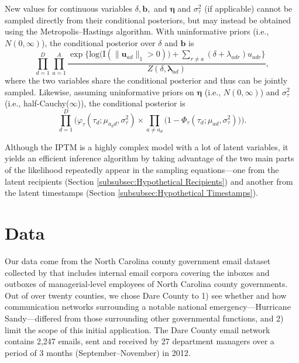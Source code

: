 \documentclass{article}
\begin{document}
New values for continuous variables $\delta, \boldsymbol{b},$ and $\boldsymbol{\eta}$ and $\sigma^2_\tau$ (if applicable) cannot be sampled directly from their conditional posteriors, but may instead be obtained using the Metropolis--Hastings algorithm. With uninformative priors (i.e., $N({0},\infty)$), the conditional posterior over $\delta$ and $\boldsymbol{b}$ is
\begin{equation}
 	   \prod_{d=1}^D
 	   \prod_{a=1}^A \frac{\exp\Big\{\mbox{log}\big(\text{I}( \lVert \boldsymbol{u}_{ad}\rVert_1 > 0)\big) + \sum\limits_{r \neq a} (\delta+\lambda_{adr})u_{adr}\Big\}}{Z(\delta,\boldsymbol{\lambda}_{ad})},
 	   \end{equation}
 	   where the two variables share the conditional posterior and thus can be jointly sampled. Likewise, assuming uninformative priors on $\boldsymbol{\eta}$ (i.e., $N({0},\infty)$) and $\sigma_{\tau}^2$ (i.e., half-Cauchy($\infty$)), the conditional posterior is
 	   \begin{equation}
 	   \prod_{d=1}^D\Big(\varphi_{\tau}(\tau_{d}; \mu_{a_d d}, \sigma_\tau^2)\times \prod_{a\neq a_d}\big(1-\Phi_{\tau}(\tau_{d}; \mu_{a d}, \sigma_\tau^2) \big)\Big).
 	   \end{equation}
 	   
 	   Although the IPTM is a highly complex model with a lot of latent variables, it yields an efficient inference algorithm by taking advantage of the two main parts of the likelihood  repeatedly appear in the sampling equations---one from the latent recipients (Section \ref{subsubsec:Hypothetical Recipients}) and another from the latent timestamps (Section \ref{subsubsec:Hypothetical Timestamps}). %
 	   
 	   \section{Data}\label{sec:Data}
 	   Our data come from the North Carolina county government email dataset collected by \cite{ben2017transparency} that includes internal email corpora covering the inboxes and outboxes of managerial-level employees of North Carolina county governments. Out of over twenty counties, we chose Dare County to 1) see whether and how communication networks surrounding a notable national emergency---Hurricane Sandy---differed from those surrounding other governmental functions, and 2) limit the scope of this initial application. The Dare County email network contains 2,247 emails, sent and received by 27 department managers over a period of 3 months (September--November) in 2012. 
 	   
\end{document}
